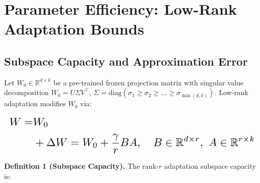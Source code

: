 \documentclass[10pt,twocolumn,letterpaper]{article}
\begin{document}
\section{Parameter Efficiency: Low-Rank Adaptation Bounds}



\subsection{Subspace Capacity and Approximation Error}


Let $W_0 \in \mathbb{R}^{d \times k}$ be a pre-trained frozen projection matrix with singular value decomposition $W_0 = U\Sigma V^\top$, $\Sigma = \text{diag}(\sigma_1 \geq \sigma_2 \geq \ldots \geq \sigma_{\min(d,k)})$. Low-rank adaptation modifies $W_0$ via:























\begin{equation}
\resizebox{\columnwidth}{!}{$\displaystyle
\begin{aligned}
W = & W_0 \\
& + \Delta W = W_0 + \frac{\gamma}{r}BA, \quad B \in \mathbb{R}^{d \times r},\ A \in \mathbb{R}^{r \times k}
\end{aligned}
$}
\end{equation}























\textbf{Definition 1 (Subspace Capacity).} The rank-$r$ adaptation subspace capacity is:
\end{document}
